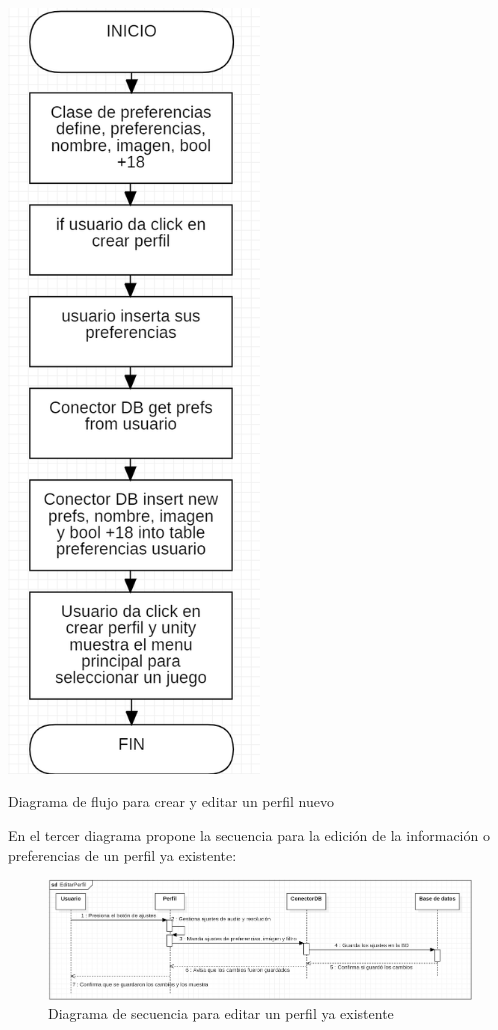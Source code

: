 \documentclass[12pt, oneside, letterpaper]{book}
\begin{document}
\begin{center}
	\centering
		\includegraphics[width=0.5\textwidth]{DFFNCrearYEditarPerfil.png}

	\caption{Diagrama de flujo para crear y editar un perfil nuevo}
	\label{DFFNCrearYEditarPerfil}
\end{center}

\bigskip
\fontsize{14}{18}\selectfont
\par 
En el tercer diagrama propone la secuencia para la edición de la información o preferencias de un perfil ya existente:

\begin{figure}[h]
    \begin{flushleft}
        \includegraphics[width=1.2\textwidth]{DSFNEditarPerfil.png}
        \caption{Diagrama de secuencia para editar un perfil ya existente}
        \label{DSFNEditarPerfil}
    \end{flushleft}
\end{figure}
\end{document}

